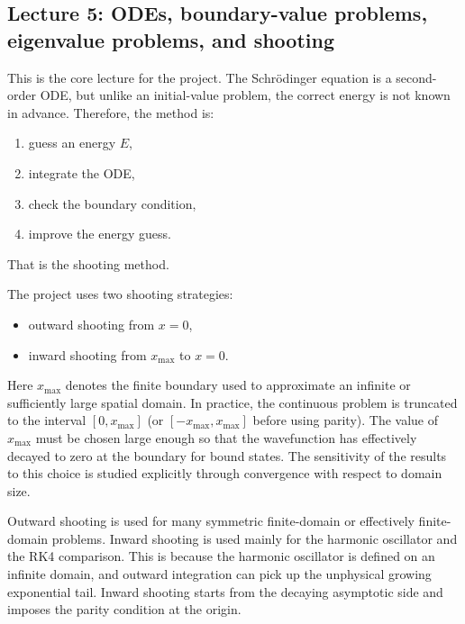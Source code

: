 \documentclass[11pt]{article}
\begin{document}
    \subsection{Lecture 5: ODEs, boundary-value problems, eigenvalue problems, and shooting}

    This is the core lecture for the project. The Schr\"odinger equation is a second-order ODE, but unlike an initial-value problem, the correct energy is not known in advance. Therefore, the method is:
    \begin{enumerate}
        \item guess an energy $E$,
        \item integrate the ODE,
        \item check the boundary condition,
        \item improve the energy guess.
    \end{enumerate}

    That is the shooting method.

    The project uses two shooting strategies:
    \begin{itemize}
        \item outward shooting from $x=0$,
        \item inward shooting from $x_{\max}$ to $x=0$.
    \end{itemize}

    Here $x_{\max}$ denotes the finite boundary used to approximate an infinite or sufficiently large spatial domain. In practice, the continuous problem is truncated to the interval $[0, x_{\max}]$ (or $[-x_{\max}, x_{\max}]$ before using parity). The value of $x_{\max}$ must be chosen large enough so that the wavefunction has effectively decayed to zero at the boundary for bound states. The sensitivity of the results to this choice is studied explicitly through convergence with respect to domain size.

    Outward shooting is used for many symmetric finite-domain or effectively finite-domain problems. Inward shooting is used mainly for the harmonic oscillator and the RK4 comparison. This is because the harmonic oscillator is defined on an infinite domain, and outward integration can pick up the unphysical growing exponential tail. Inward shooting starts from the decaying asymptotic side and imposes the parity condition at the origin.
\end{document}
